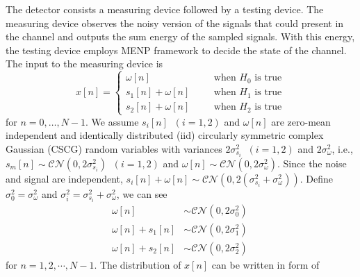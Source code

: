 The detector consists a measuring device followed by a testing device. 
The measuring device observes the noisy version of the signals that could present in the channel and outputs the sum energy of the sampled signals.
With this energy, the testing device employs MENP framework to decide the state of the channel.
The input to the measuring device is 
\begin{equation}
  x[n] = 
  \begin{cases}
	\omega[n]\;\;\;\;\;\;&\text{when ${H}_0$ is true}\\
	s_1[n]+\omega[n]\;\;\;\;\;\;&\text{when ${H}_1$ is true}\\
	s_2[n]+\omega[n]\;\;\;\;\;\;&\text{when ${H}_2$ is true}
  \end{cases}
\end{equation}
for $n = 0, \ldots, N-1$.
We assume  $s_i[n]\;\;(i=1, 2)$ and $\omega[n]$ are zero-mean independent and identically distributed (iid) circularly symmetric complex Gaussian (CSCG) random variables with variances $2\sigma_{s_i}^2\;\;(i=1, 2)$ and $2\sigma_{\omega}^2$, i.e., $s_m[n] \sim \mathcal{CN}(0, 2\sigma_{s_i}^2)\;\;(i=1, 2)$ and $\omega[n] \sim \mathcal{CN}(0, 2\sigma_{\omega}^2)$. 
Since the noise and signal are independent, $s_i[n]+\omega[n] \sim \mathcal{CN}(0, 2(\sigma_{s_i}^2 + \sigma_\omega^2))$.  Define $\sigma_0^2 = \sigma_\omega^2$ and $\sigma_i^2 = \sigma_{s_i}^2 + \sigma_\omega^2$, we can see
\begin{equation}
  \label{1129a1}
  \begin{split}
  \omega[n] &\sim \mathcal{CN}(0, 2\sigma_0^2)\\
  \omega[n] + s_1[n]&\sim \mathcal{CN}(0, 2\sigma_1^2)\\
  \omega[n] + s_2[n]&\sim \mathcal{CN}(0, 2\sigma_2^2) \,
  \end{split}
\end{equation}
for $n = 1, 2, \cdots, N-1$.  
The distribution of $x[n]$  can be written in form of
